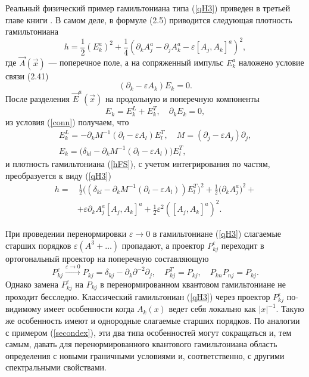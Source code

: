 \documentclass[12pt]{article}
\newcommand{\pl}{\partial}
\newcommand{\ve}{\varepsilon}
\begin{document}
    Реальный физический пример гамильтониана типа
(\ref{qH3})
    приведен в третьей главе книги
\cite{FS}.
    В самом деле, в формуле
(2.5)
    приводится следующая плотность гамильтониана
\begin{equation}
\label{hFS}
    h = \frac{1}{2} (E_{k}^{a})^{2} + \frac{1}{4}
	(\partial_{k}A_{j}^{a} - \partial_{j}A_{k}^{a}
	    - \ve [A_{j},A_{k}]^{a})^{2} ,
\end{equation}
    где
$ \vec{A}(\vec{x}) $ --- поперечное поле, а на сопряженный импульс
$ E_{k}^{a} $
    наложено условие связи (2.41)
\begin{equation}
\label{conn}
    (\partial_{k} - \ve A_{k}) E_{k} = 0 .
\end{equation}
    После разделения
$ \vec{E}^{a}(\vec{x}) $
    на продольную и поперечную компоненты
\begin{equation*}
    E_{k} = E_{k}^{L} + E_{k}^{T} ,\quad \partial_{k} E_{k} = 0,
\end{equation*}
    из условия
(\ref{conn})
    получаем, что
\begin{gather*}
    E_{k}^{L} = - \partial_{k} M^{-1} (\partial_{l} -\ve A_{l}) E_{l}^{T},
    \quad M = (\partial_{j} - \ve A_{j})\partial_{j} , \\
    E_{k} = \bigl(\delta_{kl}
	- \partial_{k} M^{-1} (\partial_{l} -\ve A_{l})\bigr) E_{l}^{T},
\end{gather*}
    и плотность гамильтониана
(\ref{hFS}),
    с учетом интегрирования по частям, преобразуется к виду
(\ref{qH3})
\begin{align*}
    h =& \,\frac{1}{2} \bigl( (\delta_{kl}
	- \partial_{k} M^{-1} (\partial_{l} -\ve A_{l}) ) E_{l}^{T} \bigr)^{2}
	+ \frac{1}{2} \bigl( \partial_{k}A_{j}^{a} \bigr)^{2} +\\
	&+ \ve \partial_{k}A_{j}^{a} [A_{j}, A_{k}]^{a}
	+\frac{1}{2} \ve^{2} ([A_{j},A_{k}]^{a})^{2} .
\end{align*}

    При проведении перенормировки
$ \ve \to 0 $
    в гамильтониане
(\ref{qH3})
    слагаемые старших порядков
$ \ve (A^{3}+\ldots) $
    пропадают, а проектор
$ P_{kj}^{\ve} $
    переходит в ортогональный проектор на поперечную составляющую
\begin{equation}
\label{Plim}
    P_{kj}^{\ve} \stackrel{\ve\to 0}{\rightarrow}
	P_{kj} = \delta_{kj} - \pl_{k} \pl^{-2} \pl_{j} ,\quad
    P_{kj}^{T} = P_{kj} ,\quad P_{kn} P_{nj} = P_{kj} .
\end{equation}
    Однако замена
$ P_{kj}^{\ve} $ на $ P_{kj} $
    в перенормированном квантовом гамильтониане не проходит бесследно.
    Классический гамильтониан
(\ref{qH3})
    через проектор
$ P_{kj}^{\ve} $
    по-видимому имеет особенности когда
$ A_{k}(x) $
    ведет себя локально как
$ |x|^{-1} $.
    Такую же особенность имеют и однородные слагаемые старших порядков.
    По аналогии с примером
(\ref{secondex}),
    эти два типа особенностей могут сокращаться и, тем самым, давать
    для перенормированного квантового гамильтониана область
    определения с новыми граничными условиями и, соответственно, с другими
    спектральными свойствами.
\end{document}
